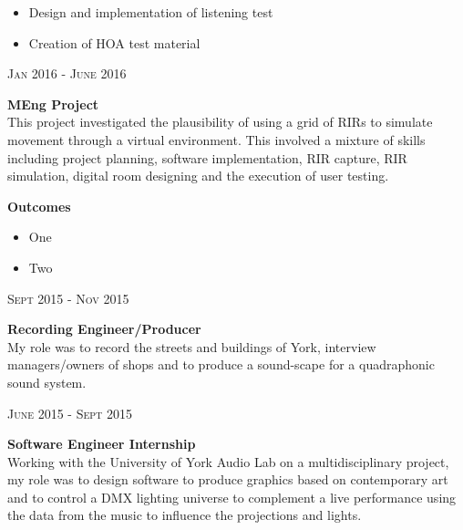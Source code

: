 \documentclass[10pt]{article}
\begin{document}
\begin{minipage}[t]{0.74\textwidth}
\begin{minipage}[t]{0.3\textwidth}
	    \begin{itemize}
	    	\item Design and implementation of listening test \\
	    	\item Creation of HOA test material
	    \end{itemize}
    \end{minipage}


    \begin{center}
    	{\textsc{Jan 2016 - June 2016}}\\
    \end{center}

    \hspace{-6mm}
    \begin{minipage}[t]{0.65\textwidth}
	    {\bf{MEng Project}}\\

	    This project investigated the plausibility of using a grid of RIRs to simulate movement through a virtual environment. This involved a mixture of skills including project planning, software implementation, RIR capture, RIR simulation, digital room designing and the execution of user testing.
    \end{minipage} \hfill
    \begin{minipage}[t]{0.3\textwidth}
	    \bf{Outcomes}\normalfont \\
	    
	    \begin{itemize}
	    	\item One
	    	\item Two
	    \end{itemize}
    \end{minipage}

    
    \begin{center}
    	{\textsc{Sept 2015 - Nov 2015}}\\
    \end{center}
    \raggedright{\bf{Recording Engineer/Producer}}\\
    My role was to record the streets and buildings of York, interview managers/owners of shops and to produce a sound-scape for a quadraphonic sound system.\\
    
    \begin{center}
    	{\textsc{June 2015 - Sept 2015}}\\
    \end{center}

    \raggedright{\bf{Software Engineer Internship}}\\
    Working with the University of York Audio Lab on a multidisciplinary project, my role was to design software to produce graphics based on contemporary art and to control a DMX lighting universe to complement a live performance using the data from the music to influence the projections and lights. \\


\end{minipage}
\end{document}
